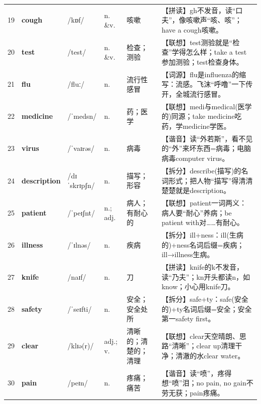\documentclass[UTF8,a4paper,11pt,oneside]{ctexbook}
\newcommand{\cellword}[1]{{\bfseries\textcolor{wordcol}{#1}}}
\newcommand{\cellipa}[1]{{\footnotesize\textcolor{ipacol}{#1}}}
\newcommand{\cellpos}[1]{\textcolor{poscol}{#1}}
\newcommand{\cellno}[1]{\textcolor{volcolor!75!black}{#1}}
\begin{document}
{\begin{longtable}{@{}C{0.045\textwidth}L{0.155\textwidth}L{0.175\textwidth}C{0.070\textwidth}L{0.180\textwidth}L{0.282\textwidth}@{}}
 \cellno{19} & \cellword{cough} & \cellipa{/kɒf/} & \cellpos{n. \&v.} & 咳嗽 & \textcolor{tagSpell}{【拼读】}gh不发音，读“口夫”，像咳嗽声“咳、咳”；have a cough咳嗽。 \\
\cellno{20} & \cellword{test} & \cellipa{/test/} & \cellpos{n. \&v.} & 检查；测验 & \textcolor{tagAssoc}{【联想】}test测验就是“检查”学得怎么样；take a test参加测验；test检查身体。 \\
 \cellno{21} & \cellword{flu} & \cellipa{/fluː/} & \cellpos{n.} & 流行性感冒 & \textcolor{tagEtym}{【词源】}flu是influenza的缩写：流感。飞沫“呼噜”一下传开，全城流行感冒。 \\
\cellno{22} & \cellword{medicine} & \cellipa{/ˈmedsn/} & \cellpos{n.} & 药；医学 & \textcolor{tagAssoc}{【联想】}medi与medical(医学的)同源；take medicine吃药，学medicine学医。 \\
 \cellno{23} & \cellword{virus} & \cellipa{/ˈvaɪrəs/} & \cellpos{n.} & 病毒 & \textcolor{tagSound}{【谐音】}读“外若斯”，看不见的“外”来坏东西=病毒；电脑病毒computer virus。 \\
\cellno{24} & \cellword{description} & \cellipa{/dɪˈskrɪpʃn/} & \cellpos{n.} & 描写；形容 & \textcolor{tagSplit}{【拆分】}describe(描写)的名词形式；把人物“描写”得清清楚楚就是description。 \\
 \cellno{25} & \cellword{patient} & \cellipa{/ˈpeɪʃnt/} & \cellpos{n.;\allowbreak{} adj.} & 病人；有耐心的 & \textcolor{tagAssoc}{【联想】}patient一词两义：病人要“耐心”养病；be patient with对……有耐心。 \\
\cellno{26} & \cellword{illness} & \cellipa{/ˈɪlnəs/} & \cellpos{n.} & 疾病 & \textcolor{tagSplit}{【拆分】}ill+ness：ill(生病的)+ness名词后缀=疾病；ill→\allowbreak{}illness生病。 \\
 \cellno{27} & \cellword{knife} & \cellipa{/naɪf/} & \cellpos{n.} & 刀 & \textcolor{tagSpell}{【拼读】}knife的k不发音，读“乃夫”；kn开头都读n，如know；小心用knife刀。 \\
\cellno{28} & \cellword{safety} & \cellipa{/ˈseɪfti/} & \cellpos{n.} & 安全；安全处所 & \textcolor{tagSplit}{【拆分】}safe+ty：safe(安全的)+ty名词后缀=安全；安全第一safety first。 \\
 \cellno{29} & \cellword{clear} & \cellipa{/klɪə(r)/} & \cellpos{adj.;\allowbreak{} v.} & 清晰的；清楚的；清理 & \textcolor{tagAssoc}{【联想】}clear天空晴朗、思路“清晰”；clear up清理干净；清澈的水clear water。 \\
\cellno{30} & \cellword{pain} & \cellipa{/peɪn/} & \cellpos{n.} & 疼痛；痛苦 & \textcolor{tagSound}{【谐音】}读“喷”，疼得想“喷”泪；no pain, no gain不劳无获；pain疼痛。 \\

\end{longtable}}
\end{document}
